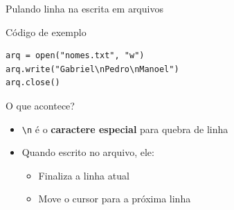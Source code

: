 \begin{frame}[fragile]{Pulando linha na escrita em arquivos}

\begin{block}{Código de exemplo}
\begin{verbatim}
arq = open("nomes.txt", "w")
arq.write("Gabriel\nPedro\nManoel")
arq.close()
\end{verbatim}
\end{block}



\begin{alertblock}{O que acontece?}
\begin{itemize}
\item \texttt{\textbackslash n} é o \textbf{caractere especial} para quebra de linha
\item Quando escrito no arquivo, ele:
  \begin{itemize}
  \item Finaliza a linha atual
  \item Move o cursor para a próxima linha
  \end{itemize}

\end{itemize}
\end{alertblock}


\end{frame}

